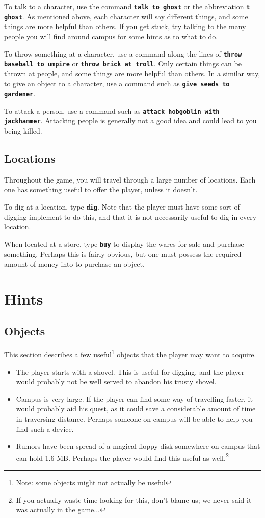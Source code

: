 \documentclass{report}
\begin{document}
To talk to a character, use the command {\tt \bf talk to ghost} or the abbreviation {\tt \bf t ghost}. As mentioned above, each character will say different things, and some things are more helpful than others. If you get stuck, try talking to the many people you will find around campus for some hints as to what to do.

To throw something at a character, use a command along the lines of {\tt \bf throw baseball to umpire} or {\tt \bf throw brick at troll}. Only certain things can be thrown at people, and some things are more helpful than others.  
In a similar way, to give an object to a character, use a command such as {\tt\bf give seeds to gardener}.

To attack a person, use a command such as {\tt \bf attack hobgoblin with jackhammer}. Attacking people is generally not a good idea and could lead to you being killed.

\section{Locations}
Throughout the game, you will travel through a large number of locations. Each one has something useful to offer the player, unless it doesn't. 

To dig at a location, type {\tt \bf dig}. Note that the player must have some sort of digging implement to do this, and that it is not necessarily useful to dig in every location.

When located at a store, type {\tt \bf buy} to display the wares for sale and purchase something. Perhaps this is fairly obvious, but one must possess the required amount of money into to purchase an object.

\chapter{Hints}
\section{Objects}
This section describes a few useful\footnote{Note: some objects might not actually be useful} objects that the player may want to acquire.

\begin{itemize}
\item The player starts with a shovel. This is useful for digging, and the player would probably not be well served to abandon his trusty shovel.

\item Campus is very large. If the player can find some way of travelling faster, it would probably aid his quest, as it could save a considerable amount of time in traversing distance. Perhaps someone on campus will be able to help you find such a device.

\item Rumors have been spread of a magical floppy disk somewhere on campus that can hold 1.6 MB. Perhaps the player would find this useful as well.\footnote{If you actually waste time looking for this, don't blame us; we never said it was actually in the game...}
\end{itemize}
\end{document}
